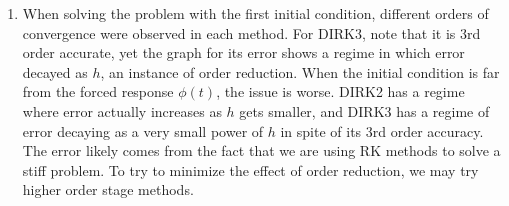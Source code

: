 \documentclass{article}
\begin{document}
\begin{enumerate}
\begin{enumerate}[label=(\alph*)]
	
	\item When solving the problem with the first initial condition, different orders of convergence were observed in each method. For DIRK3, note that it is 3rd order accurate, yet the graph for its error shows a regime in which error decayed as $h$, an instance of order reduction. When the initial condition is far from the forced response $\phi(t)$, the issue is worse. DIRK2 has a regime where error actually increases as $h$ gets smaller, and DIRK3 has a regime of error decaying as a very small power of $h$ in spite of its 3rd order accuracy. The error likely comes from the fact that we are using RK methods to solve a stiff problem. To try to minimize the effect of order reduction, we may try higher order stage methods.
	
\end{enumerate}



\end{enumerate}
\end{document}
